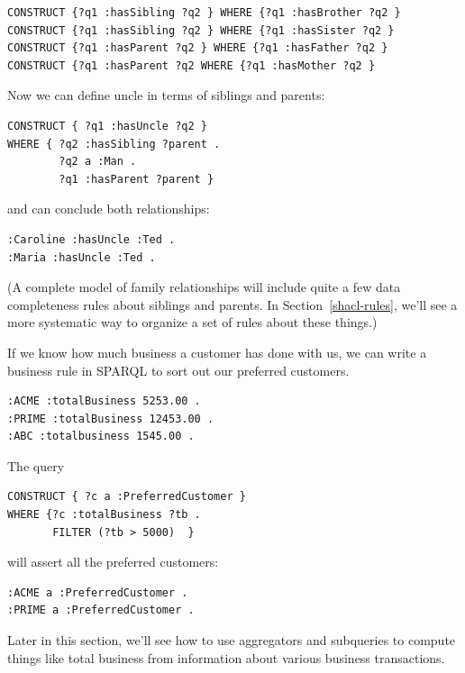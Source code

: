 \begin{lstlisting}
CONSTRUCT {?q1 :hasSibling ?q2 } WHERE {?q1 :hasBrother ?q2 }
CONSTRUCT {?q1 :hasSibling ?q2 } WHERE {?q1 :hasSister ?q2 }
CONSTRUCT {?q1 :hasParent ?q2 } WHERE {?q1 :hasFather ?q2 }
CONSTRUCT {?q1 :hasParent ?q2 WHERE {?q1 :hasMother ?q2 }
\end{lstlisting}

Now we can define uncle in terms of siblings and parents:

\begin{lstlisting}
CONSTRUCT { ?q1 :hasUncle ?q2 }
WHERE { ?q2 :hasSibling ?parent .
        ?q2 a :Man .
        ?q1 :hasParent ?parent }
\end{lstlisting}


and can conclude both relationships:

\begin{lstlisting}
:Caroline :hasUncle :Ted .
:Maria :hasUncle :Ted .
\end{lstlisting}

(A complete model of family relationships will include quite a few data
completeness rules about siblings and parents. In Section~\ref{shacl-rules}, we'll see a
more systematic way to organize a set of rules about these things.)

If we know how much business a customer has done with us, we can write a
business rule in 
SPARQL to sort out our preferred customers.

\begin{lstlisting}
:ACME :totalBusiness 5253.00 .
:PRIME :totalBusiness 12453.00 .
:ABC :totalbusiness 1545.00 .
\end{lstlisting}

The query

\begin{lstlisting}
CONSTRUCT { ?c a :PreferredCustomer }
WHERE {?c :totalBusiness ?tb .
       FILTER (?tb > 5000)  }
\end{lstlisting}

will assert all the preferred customers:

\begin{lstlisting}
:ACME a :PreferredCustomer .
:PRIME a :PreferredCustomer .
\end{lstlisting}

Later in this section, we'll see how to use aggregators and subqueries
to compute things like total business from information about various
business transactions.

